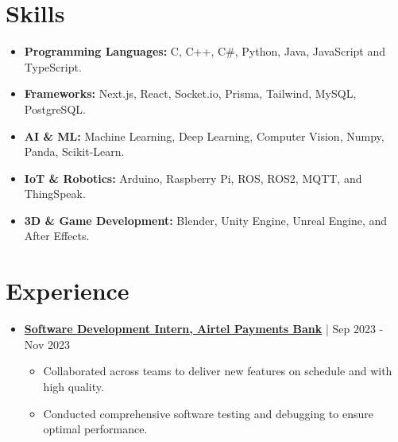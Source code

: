 \documentclass[a4paper,10pt]{article}
\newcommand{\sectionbreak}{\vspace{0cm}} %
\newcommand{\subsectionbreak}{\vspace{0cm}} %
\begin{document}
\section{Skills}
\begin{itemize}[noitemsep, topsep=0pt]
    \item \textbf{Programming Languages:} C, C++, C\#, Python, Java, JavaScript and TypeScript.
    \item \textbf{Frameworks:} Next.js, React, Socket.io, Prisma, Tailwind, MySQL, PostgreSQL.
    \item \textbf{AI \& ML:} Machine Learning, Deep Learning, Computer Vision, Numpy, Panda, Scikit-Learn.
    \item \textbf{IoT \& Robotics:} Arduino, Raspberry Pi, ROS, ROS2, MQTT, and ThingSpeak.
    \item \textbf{3D \& Game Development:} Blender, Unity Engine, Unreal Engine, and After Effects.
\end{itemize}
\sectionbreak

\section{Experience}
\begin{itemize}[noitemsep, topsep=0pt]
    \item \href{https://drive.google.com/file/d/1zCj8CKZbHcKEj6LS8N3VzG33aIENUIZA/view?usp=sharing}{\textcolor{accentcolor}{\textbf{
Software Development Intern, Airtel Payments Bank}}} | Sep 2023 - Nov 2023
        \subsectionbreak
        \begin{itemize}
            \item Collaborated across teams to deliver new features on schedule and with high quality.
            \item Conducted comprehensive software testing and debugging to ensure optimal performance.
        \end{itemize}
        \subsectionbreak
\end{itemize}

\sectionbreak

\end{document}
